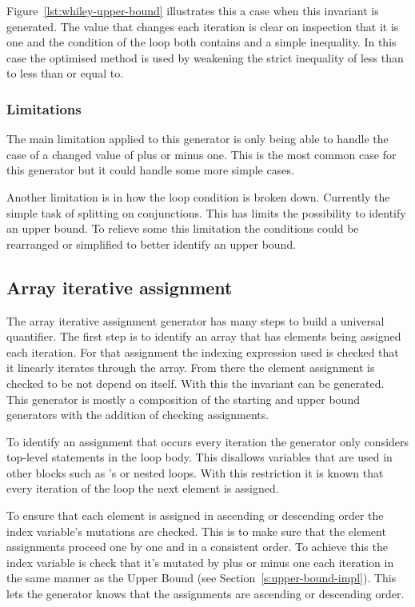 Figure~\ref{lst:whiley-upper-bound} illustrates this a case when this invariant is generated.
The value that  changes each iteration is clear on inspection that it is one and
the condition of the loop both contains  and a simple inequality.
In this case the optimised method is used by weakening the strict inequality of less than to
less than or equal to.

\subsubsection{Limitations}

The main limitation applied to this generator is only being able to 
handle the case of a changed value of plus or minus one.
This is the most common case for this generator but it could handle
some more simple cases.

Another limitation is in how the loop condition is broken down.
Currently the simple task of splitting on conjunctions.
This has limits the possibility to identify an upper bound.
To relieve some this limitation the conditions could
be rearranged or simplified to better identify an upper bound. 

\subsection{Array iterative assignment}

The array iterative assignment generator has many steps to build
a universal quantifier.
The first step is to identify an array that has elements being assigned each iteration.
For that assignment the indexing expression used is checked that it linearly
iterates through the array.
From there the element assignment is checked to be not depend on itself.
With this the invariant can be generated.
This generator is mostly a composition of the starting and upper bound generators with
the addition of checking assignments.

To identify an assignment that occurs every iteration the generator
only considers top-level statements in the loop body.
This disallows variables that are used in other blocks such as
's or nested loops.
With this restriction it is known that every iteration of the loop 
the next element is assigned.

To ensure that each element is assigned in ascending or descending order the index variable's mutations
are checked.
This is to make sure that the element assignments proceed one by one and in a consistent order.
To achieve this the index variable is check that it's mutated by plus or minus one each
iteration in the same manner as the Upper Bound (see Section~\ref{s:upper-bound-impl}).
This lets the generator knows that the assignments are ascending or descending order.

